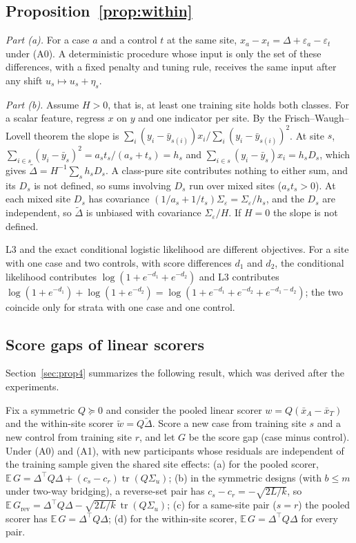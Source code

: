 \subsection{Proposition~\ref{prop:within}}

\emph{Part (a).} For a case $a$ and a control $t$ at the same site, $x_a-x_t=\Delta+\varepsilon_a-\varepsilon_t$ under (A0). A deterministic procedure whose input is only the set of these differences, with a fixed penalty and tuning rule, receives the same input after any shift $u_s\mapsto u_s+\eta_s$.

\emph{Part (b).} Assume $H>0$, that is, at least one training site holds both classes. For a scalar feature, regress $x$ on $y$ and one indicator per site. By the Frisch--Waugh--Lovell theorem the slope is $\sum_i(y_i-\bar y_{s(i)})x_i/\sum_i(y_i-\bar y_{s(i)})^2$. At site $s$, $\sum_{i\in s}(y_i-\bar y_s)^2=a_st_s/(a_s+t_s)=h_s$ and $\sum_{i\in s}(y_i-\bar y_s)x_i=h_sD_s$, which gives $\tilde\Delta=H^{-1}\sum_sh_sD_s$. A class-pure site contributes nothing to either sum, and its $D_s$ is not defined, so sums involving $D_s$ run over mixed sites ($a_st_s>0$). At each mixed site $D_s$ has covariance $(1/a_s+1/t_s)\Sigma_\varepsilon=\Sigma_\varepsilon/h_s$, and the $D_s$ are independent, so $\tilde\Delta$ is unbiased with covariance $\Sigma_\varepsilon/H$. If $H=0$ the slope is not defined.

L3 and the exact conditional logistic likelihood are different objectives. For a site with one case and two controls, with score differences $d_1$ and $d_2$, the conditional likelihood contributes $\log(1+e^{-d_1}+e^{-d_2})$ and L3 contributes $\log(1+e^{-d_1})+\log(1+e^{-d_2})=\log(1+e^{-d_1}+e^{-d_2}+e^{-d_1-d_2})$; the two coincide only for strata with one case and one control.

\subsection{Score gaps of linear scorers}

Section~\ref{sec:prop4} summarizes the following result, which was derived after the experiments.

\begin{proposition}\label{prop:leak}
Fix a symmetric $Q\succeq0$ and consider the pooled linear scorer $w=Q(\bar x_A-\bar x_T)$ and the within-site scorer $\tilde w=Q\tilde\Delta$. Score a new case from training site $s$ and a new control from training site $r$, and let $G$ be the score gap (case minus control). Under (A0) and (A1), with new participants whose residuals are independent of the training sample given the shared site effects:
(a) for the pooled scorer, $\mathbb{E}\,G=\Delta^\top Q\Delta+(c_s-c_r)\operatorname{tr}(Q\Sigma_u)$;
(b) in the symmetric designs (with $b\le m$ under two-way bridging), a reverse-set pair has $c_s-c_r=-\sqrt{2L/k}$, so $\mathbb{E}\,G_{\mathrm{rev}}=\Delta^\top Q\Delta-\sqrt{2L/k}\,\operatorname{tr}(Q\Sigma_u)$;
(c) for a same-site pair ($s=r$) the pooled scorer has $\mathbb{E}\,G=\Delta^\top Q\Delta$;
(d) for the within-site scorer, $\mathbb{E}\,G=\Delta^\top Q\Delta$ for every pair.
\end{proposition}

